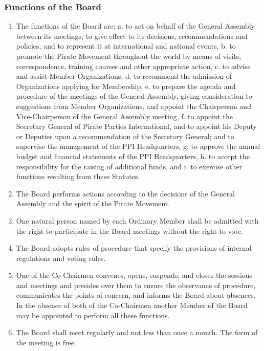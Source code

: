 \begin{frame}

\frametitle{Functions of the Board}
\label{functionsoftheboard}

\begin{enumerate}
\item The functions of the Board are:
 a. to act on behalf of the General Assembly between its meetings; to give effect to its decisions, recommendations and policies; and to represent it at international and national events,
 b. to promote the Pirate Movement throughout the world by means of visits, correspondence, training courses and other appropriate action,
 c. to advise and assist Member Organizations,
 d. to recommend the admission of Organizations applying for Membership,
 e. to prepare the agenda and procedure of the meetings of the General Assembly, giving consideration to suggestions from Member Organizations, and appoint the Chairperson and Vice-{}Chairperson of the General Assembly meeting,
 f. to appoint the Secretary General of Pirate Parties International, and to appoint his Deputy or Deputies upon a recommendation of the Secretary General; and to supervise the management of the PPI Headquarters,
 g. to approve the annual budget and ﬁnancial statements of the PPI Headquarters,
 h. to accept the responsibility for the raising of additional funds, and
 i. to exercise other functions resulting from these Statutes.

\item The Board performs actions according to the decisions of the General Assembly and the spirit of the Pirate Movement.

\item One natural person named by each Ordinary Member shall be admitted with the right to participate in the Board meetings without the right to vote.

\item The Board adopts rules of procedure that specify the provisions of internal regulations and voting rules.

\item One of the Co-{}Chairmen convenes, opens, suspends, and closes the sessions and meetings and presides over them to ensure the observance of procedure, communicates the points of concern, and informs the Board about absences. In the absence of both of the Co-{}Chairmen another Member of the Board may be appointed to perform all these functions.

\item The Board shall meet regularly and not less than once a month. The form of the meeting is free.


\end{enumerate}
\end{frame}
